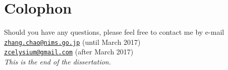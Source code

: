 \chapter*{Colophon}


\begin{center}

\doublespacing
Should you have any questions, please feel free to contact me by e-mail
\\\href{mailto:zhang.chao@nims.go.jp}{\nolinkurl{zhang.chao@nims.go.jp}} (until March 2017)
\\\href{mailto:zcelysium@gmail.com}{\nolinkurl{zcelysium@gmail.com}} (after March 2017)
\\[10ex]\emph{This is the end of the dissertation. } 

\end{center}